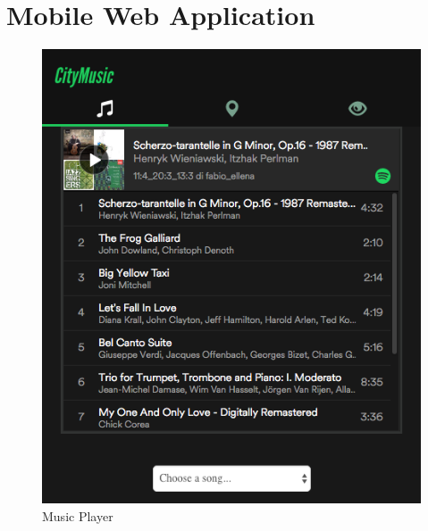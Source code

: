 \documentclass[paper=a4, fontsize=11pt]{scrartcl}
\begin{document}
\section{Mobile Web Application}
\begin{figure}[!htb]
\begin{minipage}[t]{0.45\textwidth}
\includegraphics[width=\linewidth]{images/Player.png}
\caption{Music Player}
\label{fig:music_player}
\end{minipage}
\hspace{\fill}
\begin{minipage}[t]{0.45\textwidth}

\end{minipage}
\end{figure}
\end{document}
